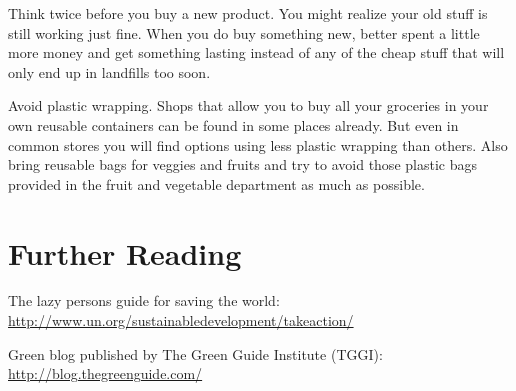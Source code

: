 \begin{suggest}{Think twice before you buy a new product.}
	You might realize your old stuff is still working just fine. When you do buy something new, better spent a little more money and get something lasting instead of any of the cheap stuff that will only end up in landfills too soon. 
\end{suggest} 

\begin{suggest}{Avoid plastic wrapping.}
	Shops that allow you to buy all your groceries in your own reusable containers can be found in some places already. But even in common stores you will find options using less plastic wrapping than others. Also bring reusable bags for veggies and fruits and try to avoid those plastic bags provided in the fruit and vegetable department as much as possible.
\end{suggest}

\clearpage

\section{Further Reading} 

\begin{suggest}{The lazy persons guide for saving the world:} 
\url{http://www.un.org/sustainabledevelopment/takeaction/}
\end{suggest}

\begin{suggest}{Green blog published by The Green Guide Institute (TGGI):}
\url{http://blog.thegreenguide.com/}
\end{suggest}
